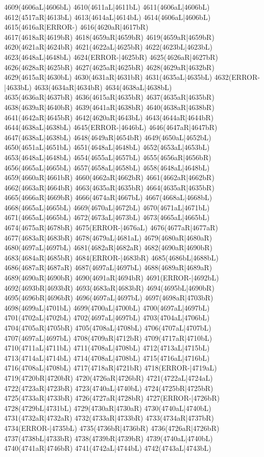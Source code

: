 4609(4606aL|4606bL) 4610(4611aL|4611bL) 4611(4606aL|4606bL) 4612(4517aR|4613bL) 4613(4614aL|4614bL) 4614(4606aL|4606bL) 4615(4616aR|ERROR-) 4616(4620aR|4617bR) \\4617(4618aR|4619bR) 4618(4659aR|4659bR) 4619(4659aR|4659bR) 4620(4621aR|4624bR) 4621(4622aL|4625bR) 4622(4623bL|4623bL) 4623(4648aL|4648bL) 4624(ERROR-|4625bR) 4625(4626aR|4627bR) \\4626(4628aR|4625bR) 4627(4625aR|4625bR) 4628(4629aR|4632bR) 4629(4615aR|4630bL) 4630(4631aR|4631bR) 4631(4635aL|4635bL) 4632(ERROR-|4633bL) 4633(4634aR|4634bR) 4634(4638aL|4638bL) \\4635(4636aR|4637bR) 4636(4615aR|4635bR) 4637(4635aR|4635bR) 4638(4639aR|4640bR) 4639(4641aR|4638bR) 4640(4638aR|4638bR) 4641(4642aR|4645bR) 4642(4620aR|4643bL) 4643(4644aR|4644bR) \\4644(4638aL|4638bL) 4645(ERROR-|4646bL) 4646(4647aR|4647bR) 4647(4638aL|4638bL) 4648(4649aR|4654bR) 4649(4650aL|4652bL) 4650(4651aL|4651bL) 4651(4648aL|4648bL) 4652(4653aL|4653bL) \\4653(4648aL|4648bL) 4654(4655aL|4657bL) 4655(4656aR|4656bR) 4656(4665aL|4665bL) 4657(4658aL|4658bL) 4658(4648aL|4648bL) 4659(4660aR|4661bR) 4660(4662aR|4662bR) 4661(4662aR|4662bR) \\4662(4663aR|4664bR) 4663(4635aR|4635bR) 4664(4635aR|4635bR) 4665(4666aR|4669bR) 4666(4674aR|4667bL) 4667(4668aL|4668bL) 4668(4665aL|4665bL) 4669(4670aL|4672bL) 4670(4671aL|4671bL) \\4671(4665aL|4665bL) 4672(4673aL|4673bL) 4673(4665aL|4665bL) 4674(4675aR|4678bR) 4675(ERROR-|4676aL) 4676(4677aR|4677aR) 4677(4683aR|4683bR) 4678(4679aL|4681aL) 4679(4680aR|4680aR) \\4680(4697aL|4697bL) 4681(4682aR|4682aR) 4682(4690aR|4690bR) 4683(4684aR|4685bR) 4684(ERROR-|4683bR) 4685(4686bL|4688bL) 4686(4687aR|4687aR) 4687(4697aL|4697bL) 4688(4689aR|4689aR) \\4689(4690aR|4690bR) 4690(4691aR|4694bR) 4691(ERROR-|4692bL) 4692(4693bR|4693bR) 4693(4683aR|4683bR) 4694(4695bL|4690bR) 4695(4696bR|4696bR) 4696(4697aL|4697bL) 4697(4698aR|4703bR) \\4698(4699aL|4701bL) 4699(4700aL|4700bL) 4700(4697aL|4697bL) 4701(4702aL|4702bL) 4702(4697aL|4697bL) 4703(4704aL|4706bL) 4704(4705aR|4705bR) 4705(4708aL|4708bL) 4706(4707aL|4707bL) \\4707(4697aL|4697bL) 4708(4709aR|4712bR) 4709(4717aR|4710bL) 4710(4711aL|4711bL) 4711(4708aL|4708bL) 4712(4713aL|4715bL) 4713(4714aL|4714bL) 4714(4708aL|4708bL) 4715(4716aL|4716bL) \\4716(4708aL|4708bL) 4717(4718aR|4721bR) 4718(ERROR-|4719aL) 4719(4720bR|4720bR) 4720(4726aR|4726bR) 4721(4722aL|4724aL) 4722(4723aR|4723bR) 4723(4740aL|4740bL) 4724(4725bR|4725bR) \\4725(4733aR|4733bR) 4726(4727aR|4728bR) 4727(ERROR-|4726bR) 4728(4729bL|4731bL) 4729(4730aR|4730aR) 4730(4740aL|4740bL) 4731(4732aR|4732aR) 4732(4733aR|4733bR) 4733(4734aR|4737bR) \\4734(ERROR-|4735bL) 4735(4736bR|4736bR) 4736(4726aR|4726bR) 4737(4738bL|4733bR) 4738(4739bR|4739bR) 4739(4740aL|4740bL) 4740(4741aR|4746bR) 4741(4742aL|4744bL) 4742(4743aL|4743bL) 